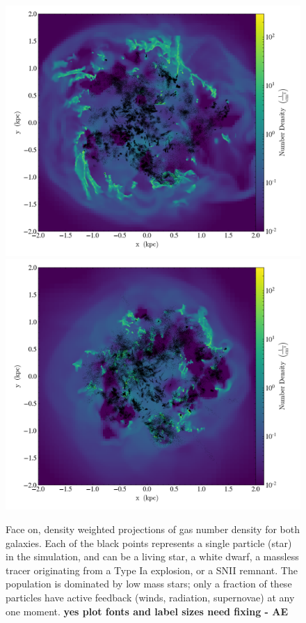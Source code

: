 \documentclass[twocolumn]{aastex61}
\begin{document}
\begin{figure}
\includegraphics[width=0.9\linewidth]{panel/sndriving_particles}\\
\vspace{0.1cm}
\includegraphics[width=0.9\linewidth]{panel/shortrad_particles}
\caption{Face on, density weighted projections of gas number density for both galaxies. Each of the black points represents a single particle (star) in the simulation, and can be a living star, a white dwarf, a massless tracer originating from a Type Ia explosion, or a SNII remnant. The population is dominated by low mass stars; only a fraction of these particles have active feedback (winds, radiation, supernovae) at any one moment. \textbf{yes plot fonts and label sizes need fixing - AE}}
\label{fig:number density}
\end{figure}
\end{document}
